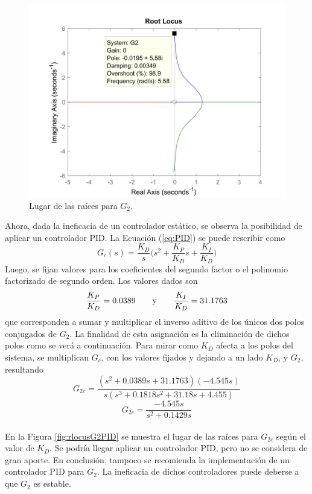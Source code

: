 \documentclass[journal]{IEEEtran}
\begin{document}
\begin{figure}[h!]
\caption{Lugar de las raíces para $G_2$.\label{fig:rlocusG2}}
  \centering
\includegraphics[scale=0.18]{control/k_G2.jpg}
\end{figure}

Ahora, dada la ineficacia de un controlador estático, se observa la posibilidad de aplicar un controlador PID. La Ecuación (\ref{eq:PID}) se puede rescribir como $$G_c(s) = \dfrac{K_D}{s}\bigg(s^2+\dfrac{K_P}{K_D}s+\dfrac{K_I}{K_D}\bigg)$$
Luego, se fijan valores para los coeficientes del segundo factor o el polinomio factorizado de segundo orden. Los valores dados son
$$\dfrac{K_P}{K_D} = 0.0389 \qquad \textnormal{y} \qquad \dfrac{K_I}{K_D} = 31.1763$$
que corresponden a sumar y multiplicar el inverso aditivo de los únicos dos polos conjugados de $G_2$. La finalidad de esta asignación es la eliminación de dichos polos como se verá a continuación. Para mirar como $K_D$ afecta a los polos del sistema, se multiplican $G_c$, con los valores fijados y dejando a un lado $K_D$, y $G_2$, resultando
$$G_{2c} = \dfrac{(s^2+0.0389s+31.1763)(-4.545 s)}{s(s^3 + 0.1818 s^2 + 31.18 s + 4.455)}$$
$$G_{2c} =  \dfrac{-4.545 s}{s^2 + 0.1429 s}$$\\

En la Figura \ref{fig:rlocusG2PID} se muestra el lugar de las raíces para $G_{2c}$ según el valor de $K_D$. Se podría llegar aplicar un controlador PID, pero no se considera de gran aporte. En conclusión, tampoco se recomienda la implementación de un controlador PID para $G_2$. La ineficacia de dichos controladores puede deberse a que $G_2$ es estable. 
\end{document}
